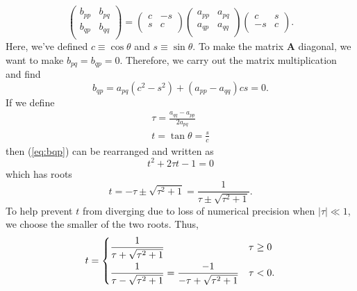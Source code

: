 \documentclass[aps,prc,reprint]{revtex4-1}
\begin{document}
        \begin{equation*}
            \begin{pmatrix}
                b_{pp} & b_{pq} \\
                b_{qp} & b_{qq} \\
            \end{pmatrix}
            =
            \begin{pmatrix}
                c & -s \\
                s & c \\
            \end{pmatrix}
            \begin{pmatrix}
                a_{pp} & a_{pq} \\
                a_{qp} & a_{qq} \\
            \end{pmatrix}
            \begin{pmatrix}
                c & s \\
                -s & c \\
            \end{pmatrix}.
        \end{equation*}
        Here, we've defined $c\equiv\cos\theta$ and $s\equiv\sin\theta$. To make the matrix $\mathbf{A}$ diagonal, we want to make $b_{pq} = b_{qp} = 0$. Therefore, we carry out the matrix multiplication and find
        \begin{equation}
            b_{qp} = a_{pq}(c^2-s^2) + (a_{pp} - a_{qq}) cs = 0.  \label{eq:bqp}
        \end{equation}
        If we define
        \begin{gather}
            \tau = \frac{a_{qq} - a_{pp}}{2a_{pq}}  \label{eq:tau} \\
            t = \tan\theta = \frac{s}{c}
        \end{gather}
        then (\ref{eq:bqp}) can be rearranged and written as
        \begin{equation*}
            t^2 + 2\tau t - 1 = 0
        \end{equation*}
        which has roots
        \begin{equation}
            t = -\tau \pm \sqrt{\tau^2 + 1} = \frac{1}{\tau \pm \sqrt{\tau^2 + 1}}.
        \end{equation}
        To help prevent $t$ from diverging due to loss of numerical precision when $|\tau| \ll 1$, we choose the smaller of the two roots. Thus,
        \begin{equation}
            t = \begin{dcases}
                \frac{1}{\tau + \sqrt{\tau^2 + 1}} & \tau \geq 0 \\
                \frac{1}{\tau - \sqrt{\tau^2 + 1}} = \frac{-1}{-\tau + \sqrt{\tau^2 + 1}} & \tau < 0. \\
            \end{dcases}
            \label{eq:t}
        \end{equation}
\end{document}
